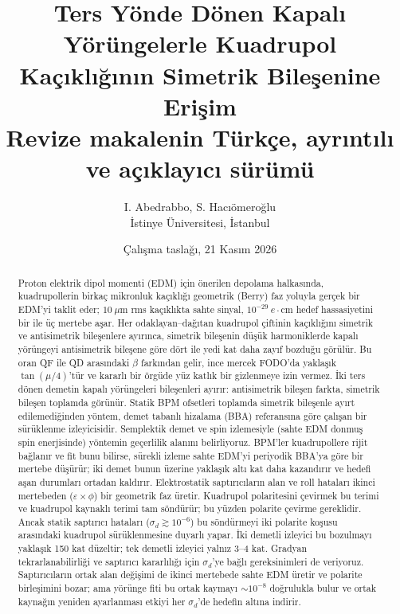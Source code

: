 \documentclass[12pt,a4paper]{extarticle}
\title{Ters Yönde Dönen Kapalı Yörüngelerle Kuadrupol Kaçıklığının Simetrik Bileşenine Erişim\\[4pt]
\large Revize makalenin Türkçe, ayrıntılı ve açıklayıcı sürümü}
\author{I. Abedrabbo, S. Hacıömeroğlu\\ \small İstinye Üniversitesi, İstanbul}
\date{Çalışma taslağı, 21 Kasım 2026}
\begin{document}
\sloppy
\maketitle

\begin{abstract}
\noindent Proton elektrik dipol momenti (EDM) için önerilen depolama halkasında, kuadrupollerin birkaç
mikronluk kaçıklığı geometrik (Berry) faz yoluyla gerçek bir EDM'yi taklit eder; $10~\mu$m rms kaçıklıkta
sahte sinyal, $10^{-29}~e\cdot$cm hedef hassasiyetini bir ile üç mertebe aşar. Her odaklayan--dağıtan
kuadrupol çiftinin kaçıklığını simetrik ve antisimetrik bileşenlere ayırınca, simetrik bileşenin düşük
harmoniklerde kapalı yörüngeyi antisimetrik bileşene göre dört ile yedi kat daha zayıf bozduğu görülür. Bu
oran QF ile QD arasındaki $\beta$ farkından gelir, ince mercek FODO'da yaklaşık $\tan(\mu/4)$'tür ve kararlı
bir örgüde yüz katlık bir gizlenmeye izin vermez. İki ters dönen demetin kapalı yörüngeleri bileşenleri
ayırır: antisimetrik bileşen farkta, simetrik bileşen toplamda görünür. Statik BPM ofsetleri toplamda simetrik
bileşenle ayırt edilemediğinden yöntem, demet tabanlı hizalama (BBA) referansına göre çalışan bir sürüklenme
izleyicisidir. Semplektik demet ve spin izlemesiyle (sahte EDM donmuş spin enerjisinde) yöntemin geçerlilik
alanını belirliyoruz. BPM'ler kuadrupollere rijit bağlanır ve fit bunu bilirse, sürekli izleme sahte EDM'yi
periyodik BBA'ya göre bir mertebe düşürür; iki demet bunun üzerine yaklaşık altı kat daha kazandırır ve
hedefi aşan durumları ortadan kaldırır. Elektrostatik saptırıcıların alan ve roll hataları ikinci mertebeden
($\varepsilon\times\phi$) bir geometrik faz üretir. Kuadrupol polaritesini çevirmek bu terimi ve kuadrupol
kaynaklı terimi tam söndürür; bu yüzden polarite çevirme gereklidir. Ancak statik saptırıcı hataları
($\sigma_d\gtrsim10^{-6}$) bu söndürmeyi iki polarite koşusu arasındaki kuadrupol sürüklenmesine duyarlı
yapar. İki demetli izleyici bu bozulmayı yaklaşık 150 kat düzeltir; tek demetli izleyici yalnız 3--4 kat.
Gradyan tekrarlanabilirliği ve saptırıcı kararlılığı için $\sigma_d$'ye bağlı gereksinimleri de veriyoruz.
Saptırıcıların ortak alan değişimi de ikinci mertebede sahte EDM üretir ve polarite birleşimini bozar; ama
yörünge fiti bu ortak kaymayı $\sim10^{-8}$ doğrulukla bulur ve ortak kaynağın yeniden ayarlanması etkiyi her
$\sigma_d$'de hedefin altına indirir.
\end{abstract}

\tableofcontents
\newpage
\end{document}
